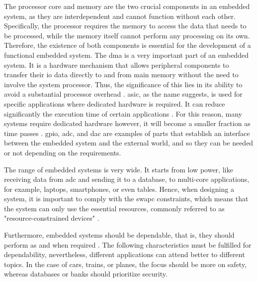 The processor core and memory are the two crucial components in an embedded system, as they are interdependent and cannot function without each 
other. Specifically, the processor requires the memory to access the data that needs to be processed, while the memory itself cannot perform any 
processing on its own. Therefore, the existence of both components is essential for the development of a functional embedded system. The \gls{dma} 
is a very important part of an embedded system. It is a hardware mechanism that allows peripheral components to transfer their \gls{io} data 
directly to and from main memory without the need to involve the system processor. Thus, the significance of this lies in its ability to avoid 
a substantial processor overhead \cite{LinuxDeviceDrivers}. \gls{asic}, as the name suggests, is used for specific applications where 
dedicated hardware is required. It can reduce significantly the execution time of certain applications \cite{FPGAaccelaration3} 
\cite{FPGAaccelaration2} \cite{FPGAaccelaration}. For this reason, many systems require dedicated hardware however, it will become a smaller 
fraction as time passes \cite{camposano1996embedded}. \gls{gpio}, \gls{adc}, and \gls{dac} are examples of parts that establish an interface 
between the embedded system and the external world, and so they can be needed or not depending on the requirements.

The range of embedded systems is very wide. It starts from low power, like receiving data from \gls{adc} and sending it to a database, to 
multi-core applications, for example, laptops, smartphones, or even tables. Hence, when designing a system, it is important to comply with 
the \gls{swapc} constraints, which means that the system can only use the essential resources, commonly referred to as "resource-constrained 
devices" \cite{swapc}. 

Furthermore, embedded systems should be dependable, that is, they should perform as and when required \cite{iec}. The following characteristics 
must be fulfilled for dependability, nevertheless, different applications can attend better to different topics. In the case of cars, trains, 
or planes, the focus should be more on safety, whereas databases or banks should prioritize security.

